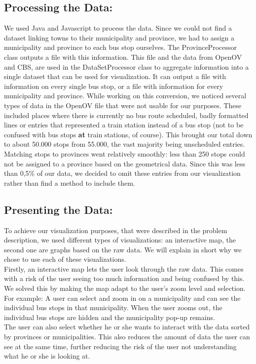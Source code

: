\documentclass[a4paper,11pt]{article}
\begin{document}
\subsection{Processing the Data:}
We used Java and Javascript to process the data. Since we could not find a dataset linking towns to their municipality and province, we had to assign a municipality and province to each bus stop ourselves. The ProvinceProcessor class outputs a file with this information.
This file and the data from OpenOV and CBS, are used in the DataSetProcessor class to aggregate information into a single dataset that can be used for visualization. It can output a file with information on every single bus stop, or a file with information for every municipality and province.
While working on this conversion, we noticed several types of data in the OpenOV file that were not usable for our purposes. These included places where there is currently no bus route scheduled, badly formatted lines or entries that represented a train station instead of a bus stop (not to be confused with bus stops \textbf{at} train stations, of course). This brought our total down to about 50.000 stops from 55.000, the vast majority being unscheduled entries. Matching stops to provinces went relatively smoothly: less than 250 stops could not be assigned to a province based on the geometrical data. Since this was less than 0,5\% of our data, we decided to omit these entries from our visualization rather than find a method to include them.
\subsection{Presenting the Data:}
To achieve our visualization purposes, that were described in the problem description, we used different types of visualizations: an interactive map, the second one are graphs based on the raw data. We will explain in short why we chose to use each of these visualizations.\\

Firstly, an interactive map lets the user look through the raw data. This comes with a risk of the user seeing too much information and being confused by this. We solved this by making the map adapt to the user's zoom level and selection. For example: A user can select and zoom in on a municipality and can see the individual bus stops in that municipality. When the user zooms out, the individual bus stops are hidden and the municipality pop-up remains.\\
The user can also select whether he or she wants to interact with the data sorted by provinces or municipalities. This also reduces the amount of data the user can see at the same time, further reducing the risk of the user not understanding what he or she is looking at.\\
\end{document}
